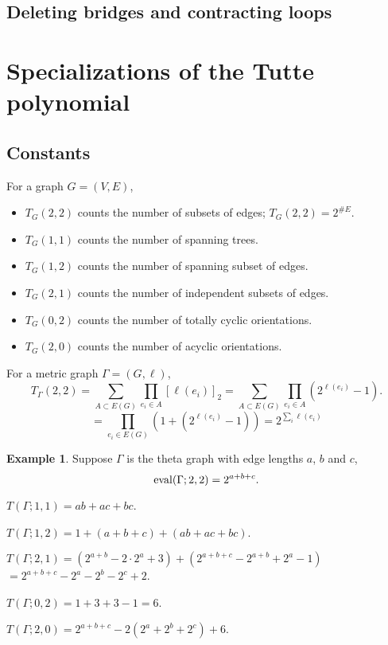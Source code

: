 \documentclass{amsart}
\theoremstyle{definition}
\newtheorem{eg}[thm]{Example}
\begin{document}
\subsection{Deleting bridges and contracting loops}


\section{Specializations of the Tutte polynomial}

\subsection{Constants}
For a graph $G = (V,E)$,
\begin{itemize}
\item 
$T_G(2,2)$ counts the number of subsets of edges;
$T_G(2,2) = 2^{\# E}$.

\item 
$T_G(1,1)$ counts the number of spanning trees.

\item 
$T_G(1,2)$ counts the number of spanning subset of edges.

\item 
$T_G(2,1)$ counts the number of independent subsets of edges.

\item 
$T_G(0,2)$ counts the number of totally cyclic orientations.

\item 
$T_G(2,0)$ counts the number of acyclic orientations.
\end{itemize}

For a metric graph $\Gamma = (G,\ell)$,
\[ T_\Gamma(2,2) = \sum_{A \subset E(G)} \prod_{e_i \in A} [\ell(e_i)]_{2}
= \sum_{A \subset E(G)} \prod_{e_i \in A} (2^{\ell(e_i)} - 1) .\]
\[ = \prod_{e_i \in E(G)} (1 + (2^{\ell(e_i)} - 1))
 = 2^{\sum_i \ell(e_i)}\]

\begin{eg}
Suppose $\Gamma$ is the theta graph with edge lengths $a$, $b$ and $c$,
\[ {\rm eval}(\Gamma; 2,2) = 2^{a+b+c} .\]

$T(\Gamma; 1,1) = ab + ac + bc$.

$T(\Gamma; 1,2) = 1 + (a + b + c) + (ab + ac + bc)$.

$T(\Gamma; 2,1) = (2^{a+b}  -2\cdot 2^a + 3) + (2^{a+b+c}-2^{a+b} + 2^a - 1)$
$= 2^{a+b+c} - 2^a - 2^b - 2^c + 2$.

$T(\Gamma; 0,2) = 1 + 3 + 3 - 1 = 6$.

$T(\Gamma; 2,0) = 2^{a+b+c} - 2(2^a + 2^b + 2^c) + 6$.
\end{eg}
\end{document}
